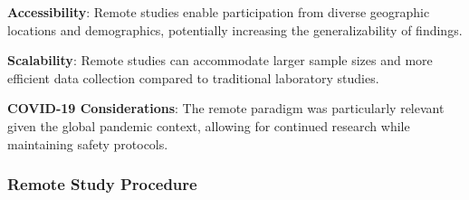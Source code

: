 \documentclass[12pt]{article}
\begin{document}
\textbf{Accessibility}: Remote studies enable participation from diverse geographic locations and demographics, potentially increasing the generalizability of findings.

\textbf{Scalability}: Remote studies can accommodate larger sample sizes and more efficient data collection compared to traditional laboratory studies.

\textbf{COVID-19 Considerations}: The remote paradigm was particularly relevant given the global pandemic context, allowing for continued research while maintaining safety protocols.

\subsubsection{Remote Study Procedure}
\end{document}
